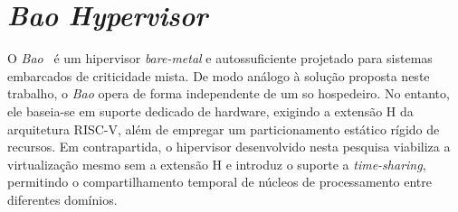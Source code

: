 \section{\textit{Bao Hypervisor}}

O \textit{Bao}~\cite{bao-paper} é um hipervisor \textit{bare-metal} e autossuficiente projetado para sistemas embarcados de criticidade mista. De modo análogo à solução proposta neste
trabalho, o \textit{Bao} opera de forma independente de um \gls{so} hospedeiro. No entanto, ele baseia-se em suporte dedicado de hardware, exigindo a extensão H da arquitetura RISC-V,
além de empregar um particionamento estático rígido de recursos. Em contrapartida, o hipervisor desenvolvido nesta pesquisa viabiliza a virtualização mesmo sem a extensão H
e introduz o suporte a \textit{time-sharing}, permitindo o compartilhamento temporal de núcleos de processamento entre diferentes domínios.


